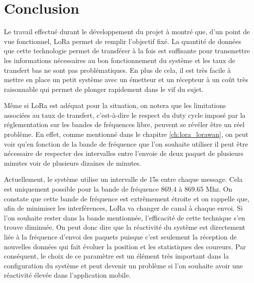 
\chapter{Conclusion}

Le travail effectué durant le développement du projet à montré que, d'un point de vue fonctionnel, LoRa permet de remplir l'objectif fixé. La quantité de données que cette technologie permet de transférer à la fois est suffisante pour transmettre les informations nécessaires au bon fonctionnement du système et les taux de transfert bas ne sont pas problématiques. En plus de cela, il est très facile à mettre en place un petit système avec un émetteur et un récepteur à un coût très raisonnable qui permet de plonger rapidement dans le vif du sujet.

Même si LoRa est adéquat pour la situation, on notera que les limitations associées au taux de transfert, c'est-à-dire le respect du duty cycle imposé par la réglementation sur les bandes de fréquences libre, peuvent se révéler être un réel problème. En effet, comme mentionné dans le chapitre \ref{ch:lora_lorawan}, on peut voir qu'en fonction de la bande de fréquence que l'on souhaite utiliser il peut être nécessaire de respecter des intervalles entre l'envoie de deux paquet de plusieurs minutes voir de plusieurs dizaines de minutes.

Actuellement, le système utilise un intervalle de 15s entre chaque message. Cela est uniquement possible pour la bande de fréquence 869.4 à 869.65 Mhz. On constate que cette bande de fréquence est extrêmement étroite et on rappelle que, afin de minimiser les interférences, LoRa va changer de canal à chaque envoi. Si l'on souhaite rester dans la bande mentionnée, l’efficacité de cette technique s’en trouve diminuée. On peut donc dire que la réactivité du système est directement liée à la fréquence d'envoi des paquets puisque c'est seulement la réception de nouvelles données qui fait évoluer la position et les statistiques des coureurs. Par conséquent, le choix de ce paramètre est un élément très important dans la configuration du système et peut devenir un problème si l'on souhaite avoir une réactivité élevée dans l'application mobile.

